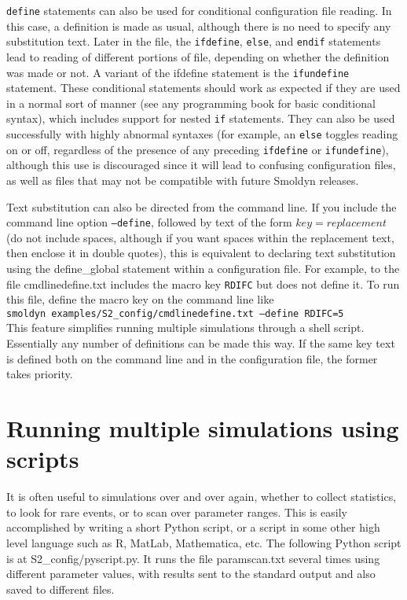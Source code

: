 \documentclass {scrbook}
\newcommand {\ttt} {\texttt}
\begin{document}
\ttt{define} statements can also be used for conditional configuration file reading. In this case, a definition is made as usual, although there is no need to specify any substitution text. Later in the file, the \ttt{ifdefine}, \ttt{else}, and \ttt{endif} statements lead to reading of different portions of file, depending on whether the definition was made or not. A variant of the ifdefine statement is the \ttt{ifundefine} statement. These conditional statements should work as expected if they are used in a normal sort of manner (see any programming book for basic conditional syntax), which includes support for nested \ttt{if} statements. They can also be used successfully with highly abnormal syntaxes (for example, an \ttt{else} toggles reading on or off, regardless of the presence of any preceding \ttt{ifdefine} or \ttt{ifundefine}), although this use is discouraged since it will lead to confusing configuration files, as well as files that may not be compatible with future Smoldyn releases.

Text substitution can also be directed from the command line. If you include the command line option \ttt{--define}, followed by text of the form $key = replacement$ (do not include spaces, although if you want spaces within the replacement text, then enclose it in double quotes), this is equivalent to declaring text substitution using the define\_global statement within a configuration file. For example, to the file cmdlinedefine.txt includes the macro key \ttt{RDIFC} but does not define it. To run this file, define the macro key on the command line like\\

\ttt{smoldyn examples/S2\_config/cmdlinedefine.txt --define RDIFC=5}\\

This feature simplifies running multiple simulations through a shell script. Essentially any number of definitions can be made this way. If the same key text is defined both on the command line and in the configuration file, the former takes priority.

\section{Running multiple simulations using scripts}

It is often useful to simulations over and over again, whether to collect statistics, to look for rare events, or to scan over parameter ranges. This is easily accomplished by writing a short Python script, or a script in some other high level language such as R, MatLab, Mathematica, etc. The following Python script is at S2\_config/pyscript.py. It runs the file paramscan.txt several times using different parameter values, with results sent to the standard output and also saved to different files.
\end{document}
